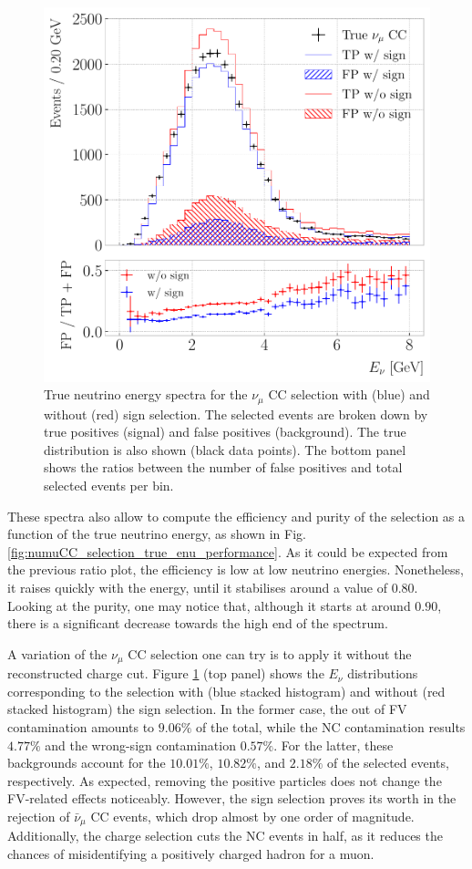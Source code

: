 \begin{figure}[t]
	\centering
	\includegraphics[width=.80\linewidth]{Images/GAr_selection/numuCC_selection_true_energy_sign_comp.pdf}
	\caption{True neutrino energy spectra for the $\nu_{\mu}$ CC selection with (blue) and without (red) sign selection. The selected events are broken down by true positives (signal) and false positives (background). The true distribution is also shown (black data points). The bottom panel shows the ratios between the number of false positives and total selected events per bin.}
	\label{fig:numuCC_sign_selection}
\end{figure}

These spectra also allow to compute the efficiency and purity of the selection as a function of the true neutrino energy, as shown in Fig. \ref{fig:numuCC_selection_true_enu_performance}. As it could be expected from the previous ratio plot, the efficiency is low at low neutrino energies. Nonetheless, it raises quickly with the energy, until it stabilises around a value of $0.80$. Looking at the purity, one may notice that, although it starts at around $0.90$, there is a significant decrease towards the high end of the spectrum.

A variation of the $\nu_{\mu}$ CC selection one can try is to apply it without the reconstructed charge cut. Figure \ref{fig:numuCC_sign_selection} (top panel) shows the $E_{\nu}$ distributions corresponding to the selection with (blue stacked histogram) and without (red stacked histogram) the sign selection. In the former case, the out of FV contamination amounts to $9.06\%$ of the total, while the NC contamination results $4.77\%$ and the wrong-sign contamination $0.57\%$. For the latter, these backgrounds account for the $10.01\%$, $10.82\%$, and $2.18\%$ of the selected events, respectively. As expected, removing the positive particles does not change the FV-related effects noticeably. However, the sign selection proves its worth in the rejection of $\bar{\nu}_{\mu}$ CC events, which drop almost by one order of magnitude. Additionally, the charge selection cuts the NC events in half, as it reduces the chances of misidentifying a positively charged hadron for a muon.

